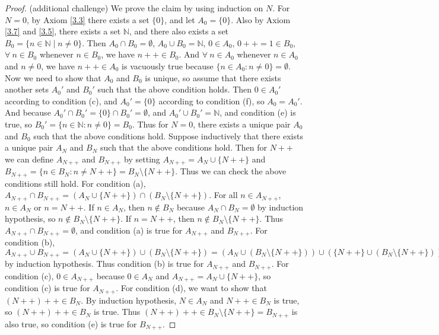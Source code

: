 \begin{proof}{(additional challenge)}
We prove the claim by using induction on \(N\).
For \(N = 0\), by Axiom \ref{3.3} there exists a set \(\{0\}\), and let \(A_0 = \{0\}\).
Also by Axiom \ref{3.7} and \ref{3.5}, there exists a set \(\mathds{N}\), and there also exists a set \(B_0 = \{n \in \mathds{N} \mid n \neq 0\}\).
Then \(A_0 \cap B_0 = \emptyset\), \(A_0 \cup B_0 = \mathds{N}\), \(0 \in A_0\), \(0++ = 1 \in B_0\), \(\forall\ n \in B_0\) whenever \(n \in B_0\), we have \(n++ \in B_0\).
And \(\forall\ n \in A_0\) whenever \(n \in A_0\) and \(n \neq 0\), we have \(n++ \in A_0\) is vacuously true because \(\{n \in A_0 : n \neq 0\} = \emptyset\).
Now we need to show that \(A_0\) and \(B_0\) is unique, so assume that there exists another sets \(A_0'\) and \(B_0'\) such that the above condition holds.
Then \(0 \in A_0'\) according to condition (c), and \(A_0' = \{0\}\) according to condition (f), so \(A_0 = A_0'\).
And because \(A_0' \cap B_0' = \{0\} \cap B_0' = \emptyset\), and \(A_0' \cup B_0' = \mathds{N}\), and condition (e) is true, so \(B_0' = \{n \in \mathds{N} : n \neq 0\} = B_0\).
Thus for \(N = 0\), there exists a unique pair \(A_0\) and \(B_0\) such that the above conditions hold.
Suppose inductively that there exists a unique pair \(A_N\) and \(B_N\) such that the above conditions hold.
Then for \(N++\) we can define \(A_{N++}\) and \(B_{N++}\) by setting \(A_{N++} = A_N \cup \{N++\}\) and \(B_{N++} = \{n \in B_N : n \neq N++\} = B_N \setminus \{N++\}\).
Thus we can check the above conditions still hold.
For condition (a), \(A_{N++} \cap B_{N++} = (A_N \cup \{N++\}) \cap (B_N \setminus \{N++\})\).
For all \(n \in A_{N++}\), \(n \in A_N\) or \(n = N++\).
If \(n \in A_N\), then \(n \notin B_N\) because \(A_N \cap B_N = \emptyset\) by induction hypothesis, so \(n \notin B_N \setminus \{N++\}\).
If \(n = N++\), then \(n \notin B_N \setminus \{N++\}\).
Thus \(A_{N++} \cap B_{N++} = \emptyset\), and condition (a) is true for \(A_{N++}\) and \(B_{N++}\).
For condition (b), \(A_{N++} \cup B_{N++} = (A_N \cup \{N++\}) \cup (B_N \setminus \{N++\}) = (A_N \cup (B_N \setminus \{N++\})) \cup (\{N++\} \cup (B_N \setminus \{N++\})) = (A_N \cup (B_N \setminus \{N++\})) \cup B_N = A_N \cup B_N = \mathds{N}\) by induction hypothesis.
Thus condition (b) is true for \(A_{N++}\) and \(B_{N++}\).
For condition (c), \(0 \in A_{N++}\) because \(0 \in A_N\) and \(A_{N++} = A_N \cup \{N++\}\), so condition (c) is true for \(A_{N++}\).
For condition (d), we want to show that \((N++)++ \in B_N\).
By induction hypothesis, \(N \in A_N\) and \(N++ \in B_N\) is true, so \((N++)++ \in B_N\) is true.
Thus \((N++)++ \in B_N \setminus \{N++\} = B_{N++}\) is also true, so condition (e) is true for \(B_{N++}\).

\end{proof}
